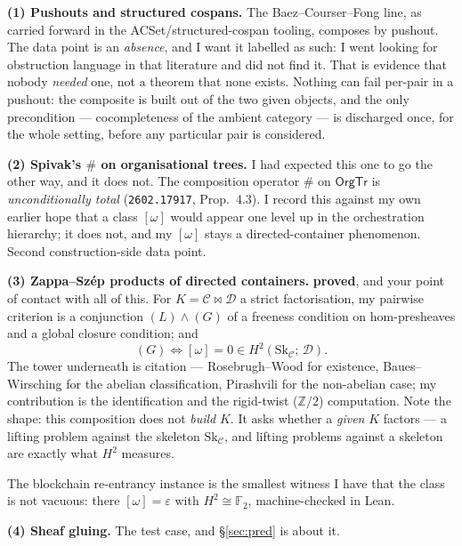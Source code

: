 \documentclass[11pt]{article}
\theoremstyle{plain}
\theoremstyle{definition}
\theoremstyle{remark}
\newcommand{\OrgTr}{\mathsf{OrgTr}}
\newcommand{\Sk}{\mathrm{Sk}}
\newcommand{\grade}[1]{\textsf{\small\textbf{#1}}}
\begin{document}
\medskip

\noindent\textbf{(1) Pushouts and structured cospans.} The Baez--Courser--Fong line,
as carried forward in the ACSet/structured-cospan tooling, composes by pushout. The
data point is an \emph{absence}, and I want it labelled as such: I went looking for
obstruction language in that literature and did not find it. That is evidence that
nobody \emph{needed} one, not a theorem that none exists. Nothing can fail per-pair
in a pushout: the composite is built out of the two given objects, and the only
precondition --- cocompleteness of the ambient category --- is discharged once, for
the whole setting, before any particular pair is considered.

\medskip

\noindent\textbf{(2) Spivak's $\#$ on organisational trees.} I had expected this one
to go the other way, and it does not. The composition operator $\#$ on $\OrgTr$ is
\emph{unconditionally total} (\texttt{2602.17917}, Prop.\ 4.3). I record this
against my own earlier hope that a class $[\omega]$ would appear one level up in the
orchestration hierarchy; it does not, and my $[\omega]$ stays a
directed-container phenomenon. Second construction-side data point.

\medskip

\noindent\textbf{(3) Zappa--Sz\'ep products of directed containers.} \grade{proved},
and your point of contact with all of this. For $K=\mathcal C\bowtie\mathcal D$ a
strict factorisation, my pairwise criterion is a conjunction $(L)\wedge(G)$ of a
freeness condition on hom-presheaves and a global closure condition; and
\[
  (G)\iff [\omega]=0 \in H^2(\Sk_{\mathcal C};\,\mathcal D).
\]
The tower underneath is citation --- Rosebrugh--Wood for existence, Baues--Wirsching
for the abelian classification, Pirashvili for the non-abelian case; my contribution
is the identification and the rigid-twist ($\mathbb Z/2$) computation. Note the
shape: this composition does not \emph{build} $K$. It asks whether a \emph{given}
$K$ factors --- a lifting problem against the skeleton $\Sk_{\mathcal C}$, and
lifting problems against a skeleton are exactly what $H^2$ measures.

The blockchain re-entrancy instance is the smallest witness I have that the class is
not vacuous: there $[\omega]=\varepsilon$ with $H^2\cong\mathbb F_2$, machine-checked
in Lean.

\medskip

\noindent\textbf{(4) Sheaf gluing.} The test case, and \S\ref{sec:pred} is about it.
\end{document}
